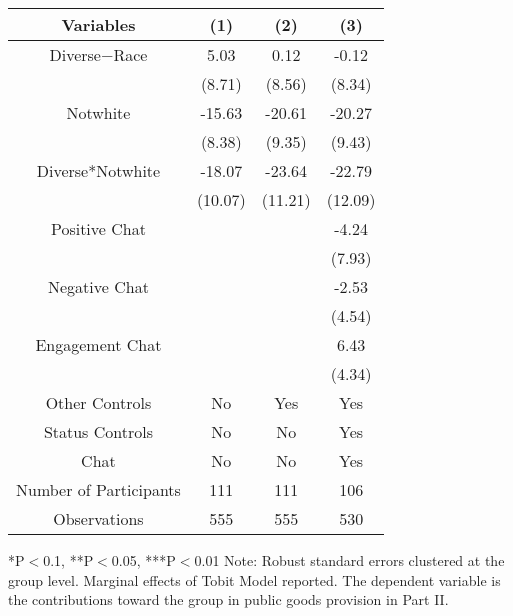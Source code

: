 \begin{table}[htbp]
    \begin{tabular}{c c c c}
    \toprule
    \textbf{Variables} & \textbf{(1)} & \textbf{(2)} & \textbf{(3)}      \\ 
\midrule
Diverse$-$Race            &     5.03     &    0.12                               &  -0.12  \\
                            &   (8.71)   &    (8.56)                             &  (8.34) \\

Notwhite                  &      -15.63\sym{*}  &    -20.61\sym{**}                 &  -20.27\sym{**}   \\
                            &      (8.38)          &    (9.35)                        &  (9.43) \\
Diverse*Notwhite         &      -18.07\sym{*}   &  -23.64\sym{**}                 &  -22.79\sym{*}  \\
                            &      (10.07)         &    (11.21)                     &  (12.09) \\


Positive Chat                        &                     &                       &  -4.24  \\
                                 &                     &                           &  (7.93)  \\
Negative  Chat                       &                     &                       &  -2.53  \\
                                 &                     &                           &  (4.54)  \\
Engagement Chat                      &                     &                       &  6.43  \\
                                 &                     &                           &  (4.34)  \\
\midrule
Other Controls   &   No &  Yes &    Yes    \\
Status Controls &   No  &    No    &    Yes    \\
Chat          &    No    &    No   &    Yes          \\
\midrule
Number of Participants & 111   &    111 &    106    \\
\midrule
Observations          &   555   &  555  &  530         \\
\bottomrule
\end{tabular}

\begin{footnotesize}
\newline
*P$<$0.1, **P$<$0.05, ***P$<$0.01
\newline
Note: Robust standard errors clustered at the group level. Marginal effects of Tobit Model reported.
\newline
The dependent variable is the contributions toward the group in public goods provision in Part II. \end{footnotesize}
\end{table}
